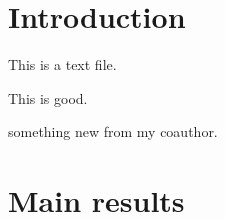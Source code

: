 \documentclass{article}
\begin{document}
\section{Introduction}%
\label{sec:introduction}


This is a text file. 


This is good. 

something new from my coauthor. 



\section{Main results}%
\label{sec:main_results}
\end{document}
